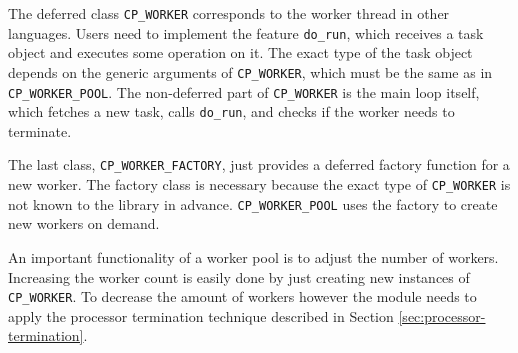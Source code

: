The deferred class \lstinline!CP_WORKER! corresponds to the worker thread in other languages.
Users need to implement the feature \lstinline!do_run!, which receives a task object and executes some operation on it.
The exact type of the task object depends on the generic arguments of \lstinline!CP_WORKER!, which must be the same as in \lstinline!CP_WORKER_POOL!.
The non-deferred part of \lstinline!CP_WORKER! is the main loop itself, which fetches a new task, calls \lstinline!do_run!, and checks if the worker needs to terminate.

The last class, \lstinline!CP_WORKER_FACTORY!, just provides a deferred factory function for a new worker.
The factory class is necessary because the exact type of \lstinline!CP_WORKER! is not known to the library in advance.
\lstinline!CP_WORKER_POOL! uses the factory to create new workers on demand.


An important functionality of a worker pool is to adjust the number of workers.
Increasing the worker count is easily done by just creating new instances of \lstinline!CP_WORKER!.
To decrease the amount of workers however the module needs to apply the processor termination technique described in Section \ref{sec:processor-termination}.


% 
% 
% 
% 
%   
%   
% 
% 
% 



